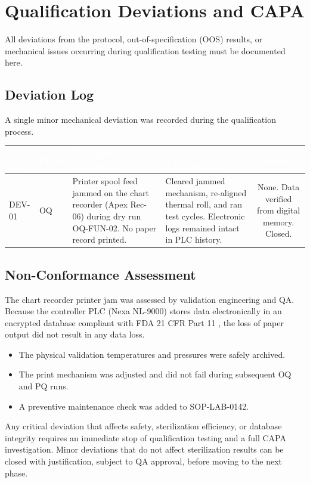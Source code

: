 \section{Qualification Deviations and CAPA}
All deviations from the protocol, out-of-specification (OOS) results, or mechanical issues occurring during qualification testing must be documented here.

\subsection{Deviation Log}
A single minor mechanical deviation was recorded during the qualification process.

\begin{tabularx}{\linewidth}{@{}l l X X c@{}}
\toprule
\rowcolor{eqnavy}
\textcolor{white}{\textbf{Dev ID}} & \textcolor{white}{\textbf{Phase}} & \textcolor{white}{\textbf{Description of Deviation}} & \textcolor{white}{\textbf{Corrective Action / Resolution}} & \textcolor{white}{\textbf{Impact}} \\
\midrule
DEV-01 & OQ & Printer spool feed jammed on the chart recorder (Apex Rec-06) during dry run OQ-FUN-02. No paper record printed. & Cleared jammed mechanism, re-aligned thermal roll, and ran test cycles. Electronic logs remained intact in PLC history. & None. Data verified from digital memory. Closed. \\
\bottomrule
\end{tabularx}

\subsection{Non-Conformance Assessment}
The chart recorder printer jam was assessed by validation engineering and QA. Because the controller PLC (Nexa NL-9000) stores data electronically in an encrypted database compliant with FDA 21 CFR Part 11 \citep{fda2003cfr}, the loss of paper output did not result in any data loss.
\begin{itemize}
  \item The physical validation temperatures and pressures were safely archived.
  \item The print mechanism was adjusted and did not fail during subsequent OQ and PQ runs.
  \item A preventive maintenance check was added to SOP-LAB-0142.
\end{itemize}

\begin{acceptancebox}
Any critical deviation that affects safety, sterilization efficiency, or database integrity requires an immediate stop of qualification testing and a full CAPA investigation. Minor deviations that do not affect sterilization results can be closed with justification, subject to QA approval, before moving to the next phase.
\end{acceptancebox}

